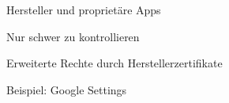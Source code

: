 \begin{frame}
	\centering
	Hersteller und proprietäre Apps
    		\begin{block}{}
				Nur schwer zu kontrollieren
			\end{block}
			\begin{block}{}
				Erweiterte Rechte durch Herstellerzertifikate
			\end{block}
			\begin{block}{}
				Beispiel: Google Settings
			\end{block}

\end{frame}